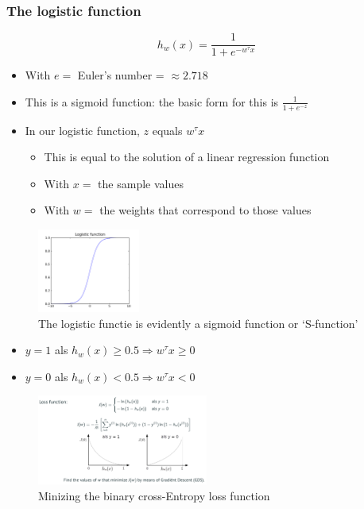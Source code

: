 \documentclass{article}
\begin{document}
\subsubsection{The logistic function}

\begin{equation}
h_w(x) = \frac{1}{1 + e^{-w^{\tau}x}}
\end{equation}

\begin{itemize}
    \item With $e =$ Euler's number = $\approx 2.718$
    \item This is a sigmoid function: the basic form for this is $\frac{1}{1+e^{-z}}$
    \item In our logistic function, $z$ equals $w^{\tau}x$
    \begin{itemize}
        \item This is equal to the solution of a linear regression function
        \item With $x =$ the sample values
        \item With $w =$ the weights that correspond to those values 
    \end{itemize}
\end{itemize}

\begin{figure}[H]
    \centering
    \includegraphics[width=0.3\textwidth]{logistic-regression.png}
    \caption{The logistic functie is evidently a sigmoid function or `S-function'}
\end{figure}

\begin{itemize}
    \item $y=1$ als $h_w(x) \geq 0.5 \Rightarrow w^{\tau}x \geq 0$
    \item $y=0$ als $h_w(x) < 0.5 \Rightarrow w^{\tau}x < 0$
\end{itemize}

\begin{figure}[H]
    \centering
    \includegraphics[width=0.5\textwidth]{img/logistic-regression-loss.png}
    \caption{Minizing the binary cross-Entropy loss function}
\end{figure}
\end{document}
